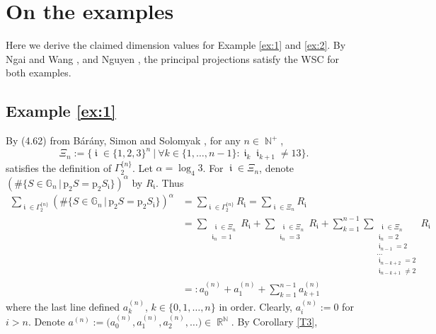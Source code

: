 \documentclass[a4paper, 11pt]{article}
\DeclareMathOperator{\N}{\mathbb{N}}
\DeclareMathOperator{\R}{\mathbb{R}}
\DeclareMathOperator{\iii}{\mathfrak{i}}
\numberwithin{equation}{section}
\theoremstyle{plain}
\theoremstyle{remark}
\theoremstyle{definition}
\begin{document}
\vspace{15 pt}


\section{On the examples}
Here we derive the claimed dimension values for Example \ref{ex:1} and \ref{ex:2}. By Ngai and Wang \cite[Theorem~2.9]{NgaiWang}, and Nguyen \cite{Nguyen}, the principal projections satisfy the WSC for both examples.



\subsection{Example \ref{ex:1}}



By (4.62) from Bárány, Simon and Solomyak \cite{MR4661364}, for any $n \in \N^+$, 
\begin{equation*}
\Xi_n := \Big\{ \iii \in \{1,2,3\}^n \ \Big| \ \forall k \in \{1,\dots,n-1\}: \iii_k \iii_{k+1} \neq 13 \Big\}.
\end{equation*}
satisfies the definition of $\Gamma_2^{\{n\}}$. Let $\alpha = {\log_{4}3}$. For $\iii \in \Xi_n$, denote $(\#\{S\in\mathbb{G}_n\, \big|\, \mathrm{p}_{2} S= \mathrm{p}_2 S_{\iii}\})^{\alpha}$ by $R_{\iii}$. Thus
\begin{equation}\label{eq:andef}\begin{aligned}
\sum_{\iii\in\Gamma_2^{\{n\}}} (\#\{S\in\mathbb{G}_n\, \big|\, \mathrm{p}_{2} S = \mathrm{p}_2 S_{\iii}\})^{\alpha} &= \sum_{\iii \in\Gamma_2^{\{n\}}} R_{\iii} = \sum_{\iii \in \Xi_n} R_{\iii} \\&= \sum_{\substack{\ \ \iii \in \Xi_n\\ \iii_n = 1}} R_{\iii} + \sum_{\substack{\ \ \iii \in \Xi_n \\ \iii_n = 3}} R_{\iii} + \sum_{k=1}^{n-1}\sum_{\substack{\ \ \iii \in \Xi_n \\ \iii_n = 2 \\ \iii_{n-1} = 2 \\ \dots \\ \iii_{n-k+2} = 2 \\ \iii_{n-k+1} \neq 2}} R_{\iii} \\[-20pt]
& =: a_0^{(n)} + a_1^{(n)}  + \sum_{k=1}^{n-1} a_{k+1}^{(n)}
\end{aligned}\end{equation}
where the last line defined $a_k^{(n)}$,  $k \in \{ 0,1,\dots,n\}$ in order. Clearly, $a_i^{(n)} := 0$ for $i>n$. Denote $a^{(n)} := \big( a_0^{(n)}, a_1^{(n)}, a_2^{(n)}, \dots \big) \in \R^{\N}$. By Corollary \ref{T3},
\end{document}
